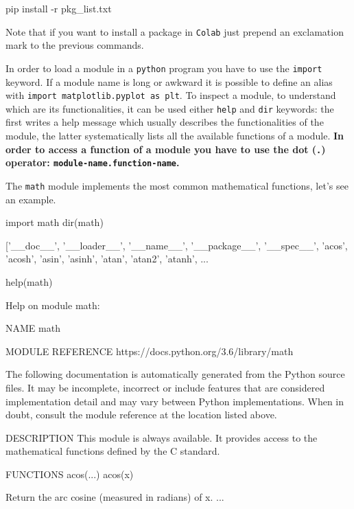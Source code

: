 \begin{ioutput}
pip install -r pkg_list.txt
\end{ioutput}

Note that if you want to install a package in \texttt{Colab} just prepend an exclamation mark to the previous commands. 

In order to load a module in a \texttt{python} program you have to use the \texttt{import} keyword.
If a module name is long or awkward it is possible to define an alias with \texttt{import matplotlib.pyplot as plt}. To inspect a module, to understand which are its functionalities, it can be used either \texttt{help} and \texttt{dir} keywords: the first writes a help message which usually describes the functionalities of the module, the latter systematically lists all the available functions of a module.
\textbf{In order to access a function of a module you have to use the dot (\texttt{.}) operator: \texttt{module-name.function-name}.}

The \texttt{math} module implements the most common mathematical functions, let's see an example. 

\begin{ipythonnon}
import math
dir(math)
\end{ipythonnon}
\begin{ioutput}
['\_\_doc\_\_',
 '\_\_loader\_\_',
 '\_\_name\_\_',
 '\_\_package\_\_',
 '\_\_spec\_\_',
 'acos',
 'acosh',
 'asin',
 'asinh',
 'atan',
 'atan2',
 'atanh',
 ...
\end{ioutput}

\begin{ipythonnon}
help(math)
\end{ipythonnon}
\begin{ioutput}
Help on module math:

NAME
math

MODULE REFERENCE
https://docs.python.org/3.6/library/math

The following documentation is automatically generated from the Python
source files.  It may be incomplete, incorrect or include features that
are considered implementation detail and may vary between Python
implementations.  When in doubt, consult the module reference at the
location listed above.

DESCRIPTION
This module is always available.  It provides access to the
mathematical functions defined by the C standard.

FUNCTIONS
acos(...)
acos(x)

Return the arc cosine (measured in radians) of x.
...
\end{ioutput}


